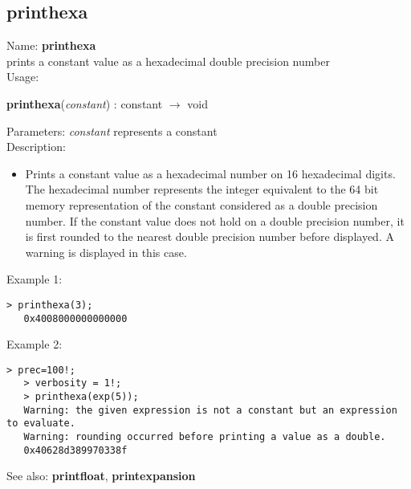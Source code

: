 \subsection{ printhexa }
\noindent Name: \textbf{printhexa}\\
prints a constant value as a hexadecimal double precision number\\

\noindent Usage: 
\begin{center}
\textbf{printhexa}(\emph{constant}) : \textsf{constant} $\rightarrow$ \textsf{void}\\
\end{center}
Parameters: 
\emph{constant} represents a constant\\

\noindent Description: \begin{itemize}

\item Prints a constant value as a hexadecimal number on 16 hexadecimal
   digits. The hexadecimal number represents the integer equivalent to
   the 64 bit memory representation of the constant considered as a
   double precision number.
   If the constant value does not hold on a double precision number, it
   is first rounded to the nearest double precision number before
   displayed. A warning is displayed in this case.
\end{itemize}
\noindent Example 1: 
\begin{center}\begin{minipage}{14.8cm}\begin{Verbatim}[frame=single]
   > printhexa(3);
   0x4008000000000000
\end{Verbatim}
\end{minipage}\end{center}
\noindent Example 2: 
\begin{center}\begin{minipage}{14.8cm}\begin{Verbatim}[frame=single]
   > prec=100!;
   > verbosity = 1!;
   > printhexa(exp(5));
   Warning: the given expression is not a constant but an expression to evaluate.
   Warning: rounding occurred before printing a value as a double.
   0x40628d389970338f
\end{Verbatim}
\end{minipage}\end{center}
See also: \textbf{printfloat}, \textbf{printexpansion}
